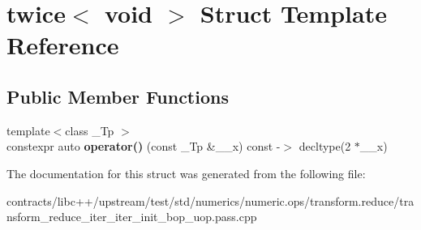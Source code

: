 \hypertarget{structtwice_3_01void_01_4}{}\section{twice$<$ void $>$ Struct Template Reference}
\label{structtwice_3_01void_01_4}
\subsection*{Public Member Functions}
\begin{DoxyCompactItemize}
\item 
\mbox{\label{structtwice_3_01void_01_4_af1b2bf073fae10ed9e8ca0e76256bdf7}} 
{\footnotesize template$<$class \+\_\+\+Tp $>$ }\\constexpr auto {\bfseries operator()} (const \+\_\+\+Tp \&\+\_\+\+\_\+x) const -\/$>$ decltype(2 $\ast$\+\_\+\+\_\+x)
\end{DoxyCompactItemize}


The documentation for this struct was generated from the following file\+:\begin{DoxyCompactItemize}
\item 
contracts/libc++/upstream/test/std/numerics/numeric.\+ops/transform.\+reduce/transform\+\_\+reduce\+\_\+iter\+\_\+iter\+\_\+init\+\_\+bop\+\_\+uop.\+pass.\+cpp\end{DoxyCompactItemize}
